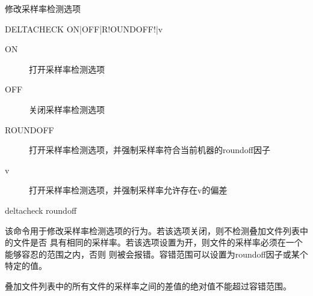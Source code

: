\label{sss:deltacheck}

修改采样率检测选项

\begin{SACSTX}
DELTACHECK ON|OFF|R!OUNDOFF!|v
\end{SACSTX}

\begin{description}
\item [ON] 打开采样率检测选项
\item [OFF] 关闭采样率检测选项
\item [ROUNDOFF] 打开采样率检测选项，并强制采样率符合当前机器的roundoff因子
\item [v] 打开采样率检测选项，并强制采样率允许存在v的偏差
\end{description}

\begin{SACDFT}
deltacheck roundoff
\end{SACDFT}

该命令用于修改采样率检测选项的行为。若该选项关闭，则不检测叠加文件列表中的文件是否
具有相同的采样率。若该选项设置为开，则文件的采样率必须在一个能够容忍的范围之内，否则
则被会报错。容错范围可以设置为roundoff因子或某个特定的值。

叠加文件列表中的所有文件的采样率之间的差值的绝对值不能超过容错范围。
